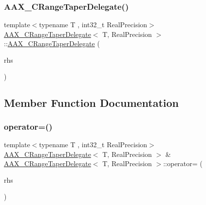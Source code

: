 \subsubsection{\texorpdfstring{AAX\_CRangeTaperDelegate()}{AAX\_CRangeTaperDelegate()}\hspace{0.1cm}{\footnotesize\ttfamily [2/2]}}
{\footnotesize\ttfamily template$<$typename T , int32\+\_\+t Real\+Precision$>$ \\
\mbox{\hyperlink{a01557}{A\+A\+X\+\_\+\+C\+Range\+Taper\+Delegate}}$<$ T, Real\+Precision $>$\+::\mbox{\hyperlink{a01557}{A\+A\+X\+\_\+\+C\+Range\+Taper\+Delegate}} (\begin{DoxyParamCaption}\item[{const \mbox{\hyperlink{a01557}{A\+A\+X\+\_\+\+C\+Range\+Taper\+Delegate}}$<$ T, Real\+Precision $>$ \&}]{rhs }\end{DoxyParamCaption})}



\subsection{Member Function Documentation}
\mbox{\label{a01557_abb6a95a43a8614a1c83fc84208d2e8f1}} 
\subsubsection{\texorpdfstring{operator=()}{operator=()}}
{\footnotesize\ttfamily template$<$typename T , int32\+\_\+t Real\+Precision$>$ \\
\mbox{\hyperlink{a01557}{A\+A\+X\+\_\+\+C\+Range\+Taper\+Delegate}}$<$ T, Real\+Precision $>$ \& \mbox{\hyperlink{a01557}{A\+A\+X\+\_\+\+C\+Range\+Taper\+Delegate}}$<$ T, Real\+Precision $>$\+::operator= (\begin{DoxyParamCaption}\item[{\mbox{\hyperlink{a01557}{A\+A\+X\+\_\+\+C\+Range\+Taper\+Delegate}}$<$ T, Real\+Precision $>$ \&}]{rhs }\end{DoxyParamCaption})}

\mbox{\label{a01557_a787f7649ff4b94af1642bfa0198007a2}} 
